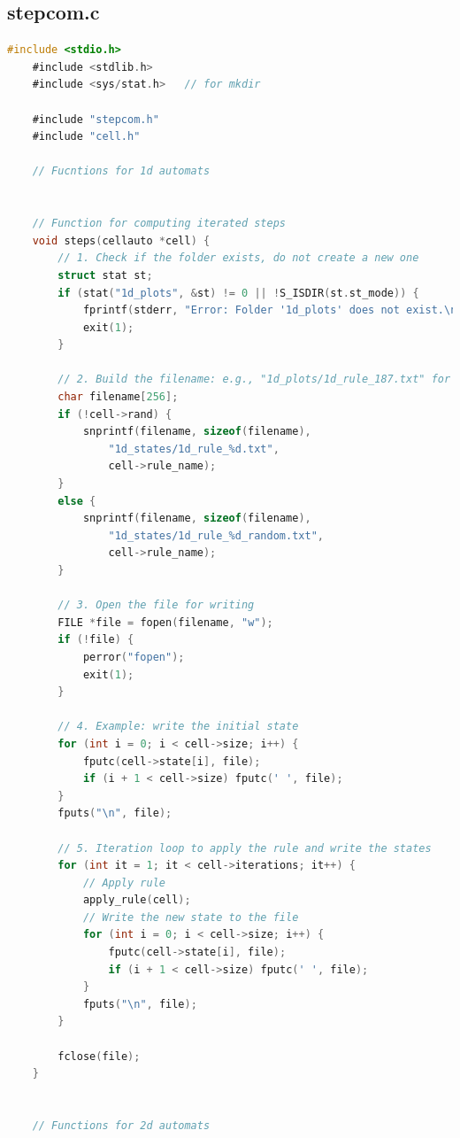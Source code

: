 \documentclass[12pt,a4paper]{article}
\begin{document}
\subsection*{\small stepcom.c}
\begin{lstlisting}[caption={\small stepcom.c},label={lst:p7001},basicstyle=\ttfamily\tiny,language=C]
    #include <stdio.h>
    #include <stdlib.h>
    #include <sys/stat.h>   // for mkdir

    #include "stepcom.h"
    #include "cell.h"

    // Fucntions for 1d automats


    // Function for computing iterated steps
    void steps(cellauto *cell) {
        // 1. Check if the folder exists, do not create a new one
        struct stat st;
        if (stat("1d_plots", &st) != 0 || !S_ISDIR(st.st_mode)) {
            fprintf(stderr, "Error: Folder '1d_plots' does not exist.\n");
            exit(1);
        }

        // 2. Build the filename: e.g., "1d_plots/1d_rule_187.txt" for different states
        char filename[256];
        if (!cell->rand) {
            snprintf(filename, sizeof(filename),
                "1d_states/1d_rule_%d.txt",
                cell->rule_name);
        }
        else {
            snprintf(filename, sizeof(filename),
                "1d_states/1d_rule_%d_random.txt",
                cell->rule_name);
        }

        // 3. Open the file for writing
        FILE *file = fopen(filename, "w");
        if (!file) {
            perror("fopen");
            exit(1);
        }

        // 4. Example: write the initial state
        for (int i = 0; i < cell->size; i++) {
            fputc(cell->state[i], file);
            if (i + 1 < cell->size) fputc(' ', file);   
        }
        fputs("\n", file);

        // 5. Iteration loop to apply the rule and write the states
        for (int it = 1; it < cell->iterations; it++) {
            // Apply rule
            apply_rule(cell);
            // Write the new state to the file
            for (int i = 0; i < cell->size; i++) {
                fputc(cell->state[i], file);
                if (i + 1 < cell->size) fputc(' ', file);
            }
            fputs("\n", file);
        }

        fclose(file);
    }


    // Functions for 2d automats



\end{lstlisting}
\end{document}
